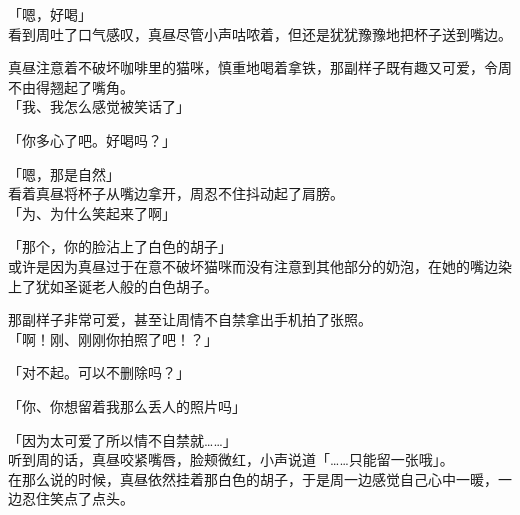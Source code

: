 「嗯，好喝」\\

看到周吐了口气感叹，真昼尽管小声咕哝着，但还是犹犹豫豫地把杯子送到嘴边。

真昼注意着不破坏咖啡里的猫咪，慎重地喝着拿铁，那副样子既有趣又可爱，令周不由得翘起了嘴角。\\

「我、我怎么感觉被笑话了」

「你多心了吧。好喝吗？」

「嗯，那是自然」\\

看着真昼将杯子从嘴边拿开，周忍不住抖动起了肩膀。\\

「为、为什么笑起来了啊」

「那个，你的脸沾上了白色的胡子」\\

或许是因为真昼过于在意不破坏猫咪而没有注意到其他部分的奶泡，在她的嘴边染上了犹如圣诞老人般的白色胡子。

那副样子非常可爱，甚至让周情不自禁拿出手机拍了张照。\\

「啊！刚、刚刚你拍照了吧！？」

「对不起。可以不删除吗？」

「你、你想留着我那么丢人的照片吗」

「因为太可爱了所以情不自禁就……」\\

听到周的话，真昼咬紧嘴唇，脸颊微红，小声说道「……只能留一张哦」。\\

在那么说的时候，真昼依然挂着那白色的胡子，于是周一边感觉自己心中一暖，一边忍住笑点了点头。
